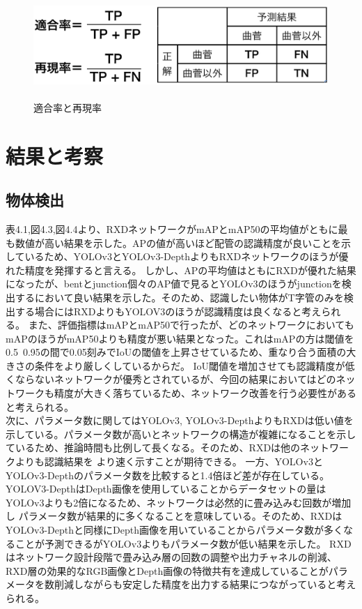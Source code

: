 \begin{figure}[htbt]
	\centering
	 \includegraphics[height=40mm]{recall.eps}
	 \caption{適合率と再現率}
	 \label{fig:f2}
\end{figure}


\section{結果と考察}
\subsection{物体検出}
表4.1,図4.3,図4.4より、RXDネットワークがmAPとmAP50の平均値がともに最も数値が高い結果を示した。APの値が高いほど配管の認識精度が良いことを示しているため、YOLOv3とYOLOv3-DepthよりもRXDネットワークのほうが優れた精度を発揮すると言える。
しかし、APの平均値はともにRXDが優れた結果になったが、bentとjunction個々のAP値で見るとYOLOv3のほうがjunctionを検出するにおいて良い結果を示した。そのため、認識したい物体がT字管のみを検出する場合にはRXDよりもYOLOV3のほうが認識精度は良くなると考えられる。
また、評価指標はmAPとmAP50で行ったが、どのネットワークにおいてもmAPのほうがmAP50よりも精度が悪い結果となった。これはmAPの方は閾値を0.5~0.95の間で0.05刻みでIoUの閾値を上昇させているため、重なり合う面積の大きさの条件をより厳しくしているからだ。
IoU閾値を増加させても認識精度が低くならないネットワークが優秀とされているが、今回の結果においてはどのネットワークも精度が大きく落ちているため、ネットワーク改善を行う必要性があると考えられる。\\
次に、パラメータ数に関してはYOLOv3, YOLOv3-DepthよりもRXDは低い値を示している。パラメータ数が高いとネットワークの構造が複雑になることを示しているため、推論時間も比例して長くなる。そのため、RXDは他のネットワークよりも認識結果を
より速く示すことが期待できる。
一方、YOLOv3とYOLOv3-Depthのパラメータ数を比較すると1.4倍ほど差が存在している。YOLOV3-DepthはDepth画像を使用していることからデータセットの量はYOLOv3よりも2倍になるため、ネットワークは必然的に畳み込みむ回数が増加し
パラメータ数が結果的に多くなることを意味している。そのため、RXDはYOLOv3-Depthと同様にDepth画像を用いていることからパラメータ数が多くなることが予測できるがYOLOv3よりもパラメータ数が低い結果を示した。
RXDはネットワーク設計段階で畳み込み層の回数の調整や出力チャネルの削減、RXD層の効果的なRGB画像とDepth画像の特徴共有を達成していることがパラメータを数削減しながらも安定した精度を出力する結果につながっていると考えられる。\\




